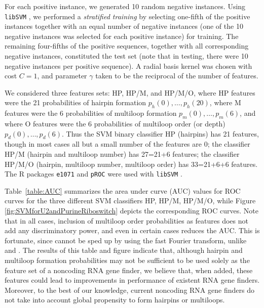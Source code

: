 For each positive instance, we generated 10 random negative instances.
Using {\tt libSVM} \cite{libSVM}, we performed a {\em stratified training}
by selecting one-fifth of the
positive instances together with an equal number of negative instances
(one of the 10 negative instances was selected for each positive instance)
for training. The remaining four-fifths of the positive sequences, together
with all corresponding negative instances, constituted the test set
(note that in testing, there were 10 negative instances per positive sequence).
A radial basis kernel was chosen with cost $C=1$, and parameter $\gamma$
taken to be the reciprocal of the number of features.

We considered three features sets: HP, HP/M, and HP/M/O,
where HP features were the 21 probabilities of hairpin formation
$p_h(0),\ldots,p_h(20)$, where M features were the 6 probabilities of
multiloop formation $p_m(0),\ldots,p_m(6)$, and where O features
were the 6 probabilities of multiloop order (or depth) $p_d(0),\ldots,p_d(6)$.
Thus the SVM binary classifier HP (hairpins) has 21 features, though in
most cases all but a small number of the features are $0$;
the classifier HP/M (hairpin and multiloop number) has
27=21+6 features; the classifier HP/M/O (hairpin, multiloop number,
multiloop order) has 33=21+6+6 features.
The R packages {\tt e1071} \cite{RpackageForSVM} and {\tt pROC} \cite{pROC}
were used with {\tt libSVM} \cite{libSVM}.

Table~\ref{table:AUC} summarizes the area under curve (AUC) values for
ROC curves for the three different SVM classifiers HP, HP/M, HP/M/O,
while Figure \ref{fig:SVMforU2andPurineRiboswitch} depicts the corresponding
ROC curves. Note that in all cases, inclusion of multiloop order probabilities
as features does not add any discriminatory power, and even in certain cases
reduces the AUC. This is fortunate, since {\rnamlorder} cannot be
sped up by using the fast Fourier transform, unlike {\rnahairpin} and
{\rnamlnumber}. The results of this table and figure indicate that,
although hairpin and multiloop formation probabilities may not be
sufficient to be used solely as the feature set of a noncoding RNA gene
finder, we believe that, when added, these features could lead to improvements
in performance of existent RNA gene finders. Moreover, to the best of our
knowledge, current noncoding RNA gene finders do not take into account
global propensity to form hairpins or multiloops.

